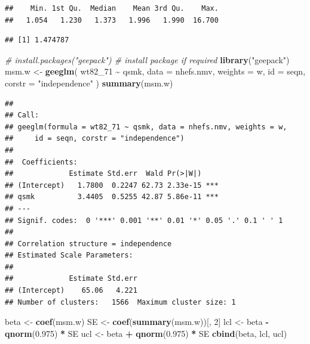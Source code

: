 \documentclass[
  10pt,
]{book}
\newenvironment{Shaded}{\begin{snugshade}}{\end{snugshade}}
\newcommand{\CommentTok}[1]{\textcolor[rgb]{0.56,0.35,0.01}{\textit{#1}}}
\newcommand{\DataTypeTok}[1]{\textcolor[rgb]{0.13,0.29,0.53}{#1}}
\newcommand{\DecValTok}[1]{\textcolor[rgb]{0.00,0.00,0.81}{#1}}
\newcommand{\FloatTok}[1]{\textcolor[rgb]{0.00,0.00,0.81}{#1}}
\newcommand{\KeywordTok}[1]{\textcolor[rgb]{0.13,0.29,0.53}{\textbf{#1}}}
\newcommand{\NormalTok}[1]{#1}
\newcommand{\OperatorTok}[1]{\textcolor[rgb]{0.81,0.36,0.00}{\textbf{#1}}}
\newcommand{\StringTok}[1]{\textcolor[rgb]{0.31,0.60,0.02}{#1}}
\begin{document}
\begin{verbatim}
##    Min. 1st Qu.  Median    Mean 3rd Qu.    Max. 
##   1.054   1.230   1.373   1.996   1.990  16.700
\end{verbatim}

\begin{Shaded}
\end{Shaded}

\begin{verbatim}
## [1] 1.474787
\end{verbatim}

\begin{Shaded}
\begin{Highlighting}[]
\CommentTok{\# install.packages("geepack") \# install package if required}
\KeywordTok{library}\NormalTok{(}\StringTok{"geepack"}\NormalTok{)}
\NormalTok{msm.w \textless{}{-}}\StringTok{ }\KeywordTok{geeglm}\NormalTok{(}
\NormalTok{  wt82\_}\DecValTok{71} \OperatorTok{\textasciitilde{}}\StringTok{ }\NormalTok{qsmk,}
  \DataTypeTok{data =}\NormalTok{ nhefs.nmv,}
  \DataTypeTok{weights =}\NormalTok{ w,}
  \DataTypeTok{id =}\NormalTok{ seqn,}
  \DataTypeTok{corstr =} \StringTok{"independence"}
\NormalTok{)}
\KeywordTok{summary}\NormalTok{(msm.w)}
\end{Highlighting}
\end{Shaded}

\begin{verbatim}
## 
## Call:
## geeglm(formula = wt82_71 ~ qsmk, data = nhefs.nmv, weights = w, 
##     id = seqn, corstr = "independence")
## 
##  Coefficients:
##             Estimate Std.err  Wald Pr(>|W|)    
## (Intercept)   1.7800  0.2247 62.73 2.33e-15 ***
## qsmk          3.4405  0.5255 42.87 5.86e-11 ***
## ---
## Signif. codes:  0 '***' 0.001 '**' 0.01 '*' 0.05 '.' 0.1 ' ' 1
## 
## Correlation structure = independence 
## Estimated Scale Parameters:
## 
##             Estimate Std.err
## (Intercept)    65.06   4.221
## Number of clusters:   1566  Maximum cluster size: 1
\end{verbatim}

\begin{Shaded}
\begin{Highlighting}[]
\NormalTok{beta \textless{}{-}}\StringTok{ }\KeywordTok{coef}\NormalTok{(msm.w)}
\NormalTok{SE \textless{}{-}}\StringTok{ }\KeywordTok{coef}\NormalTok{(}\KeywordTok{summary}\NormalTok{(msm.w))[, }\DecValTok{2}\NormalTok{]}
\NormalTok{lcl \textless{}{-}}\StringTok{ }\NormalTok{beta }\OperatorTok{{-}}\StringTok{ }\KeywordTok{qnorm}\NormalTok{(}\FloatTok{0.975}\NormalTok{) }\OperatorTok{*}\StringTok{ }\NormalTok{SE}
\NormalTok{ucl \textless{}{-}}\StringTok{ }\NormalTok{beta }\OperatorTok{+}\StringTok{ }\KeywordTok{qnorm}\NormalTok{(}\FloatTok{0.975}\NormalTok{) }\OperatorTok{*}\StringTok{ }\NormalTok{SE}
\KeywordTok{cbind}\NormalTok{(beta, lcl, ucl)}
\end{Highlighting}
\end{Shaded}
\end{document}
